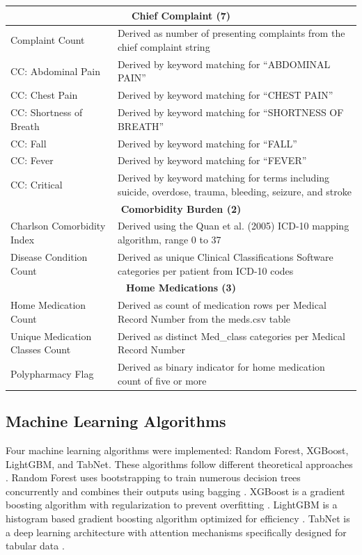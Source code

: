 \documentclass[harvard,article]{frontiersinFPHY_FAMS}
\begin{document}
\begin{table}[t]
\begin{tabularx}{\textwidth}{@{}l X@{}}
\midrule
\multicolumn{2}{c}{\textbf{Chief Complaint (7)}} \\
\midrule
Complaint Count & Derived as number of presenting complaints from the chief complaint string \\
CC: Abdominal Pain & Derived by keyword matching for ``ABDOMINAL PAIN'' \\
CC: Chest Pain & Derived by keyword matching for ``CHEST PAIN'' \\
CC: Shortness of Breath & Derived by keyword matching for ``SHORTNESS OF BREATH'' \\
CC: Fall & Derived by keyword matching for ``FALL'' \\
CC: Fever & Derived by keyword matching for ``FEVER'' \\
CC: Critical & Derived by keyword matching for terms including suicide, overdose, trauma, bleeding, seizure, and stroke \\
\midrule
\multicolumn{2}{c}{\textbf{Comorbidity Burden (2)}} \\
\midrule
Charlson Comorbidity Index & Derived using the Quan et al. (2005) ICD-10 mapping algorithm, range 0 to 37 \\
Disease Condition Count & Derived as unique Clinical Classifications Software categories per patient from ICD-10 codes \\
\midrule
\multicolumn{2}{c}{\textbf{Home Medications (3)}} \\
\midrule
Home Medication Count & Derived as count of medication rows per Medical Record Number from the meds.csv table \\
Unique Medication Classes Count & Derived as distinct Med\_class categories per Medical Record Number \\
Polypharmacy Flag & Derived as binary indicator for home medication count of five or more \\
\bottomrule
\end{tabularx}
\end{table}

\subsection{Machine Learning Algorithms}

Four machine learning algorithms were implemented: Random Forest, XGBoost, LightGBM, and TabNet. These algorithms follow different theoretical approaches \cite{ricciardi2024, wu2025}. Random Forest uses bootstrapping to train numerous decision trees concurrently and combines their outputs using bagging \cite{ricciardi2024}. XGBoost is a gradient boosting algorithm with regularization to prevent overfitting \cite{wang2025}. LightGBM is a histogram based gradient boosting algorithm optimized for efficiency \cite{wu2025}. TabNet is a deep learning architecture with attention mechanisms specifically designed for tabular data \cite{lin2024}.
\end{document}

